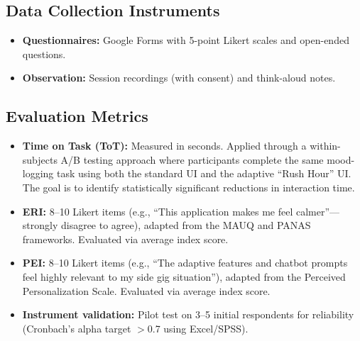 \subsection{Data Collection Instruments}

\begin{itemize}
    \item \textbf{Questionnaires:} Google Forms with 5-point Likert scales and open-ended questions.
    \item \textbf{Observation:} Session recordings (with consent) and think-aloud notes.
\end{itemize}

\subsection{Evaluation Metrics}

\begin{itemize}
    \item \textbf{Time on Task (ToT):} Measured in seconds. Applied through a within-subjects A/B testing approach where participants complete the same mood-logging task using both the standard UI and the adaptive ``Rush Hour'' UI. The goal is to identify statistically significant reductions in interaction time.
    \item \textbf{ERI:} 8--10 Likert items (e.g., ``This application makes me feel calmer''---strongly disagree to agree), adapted from the MAUQ and PANAS frameworks. Evaluated via average index score.
    \item \textbf{PEI:} 8--10 Likert items (e.g., ``The adaptive features and chatbot prompts feel highly relevant to my side gig situation''), adapted from the Perceived Personalization Scale. Evaluated via average index score.
    \item \textbf{Instrument validation:} Pilot test on 3--5 initial respondents for reliability (Cronbach's alpha target $>$0.7 using Excel/SPSS).
\end{itemize}


